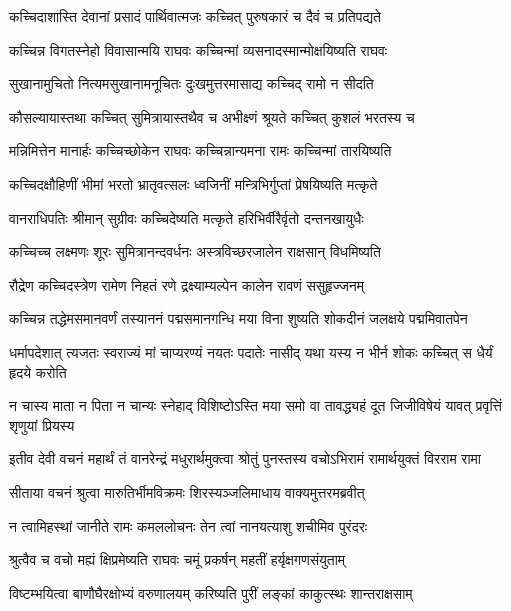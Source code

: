 \twolineshloka
{कच्चिदाशास्ति देवानां प्रसादं पार्थिवात्मजः}
{कच्चित् पुरुषकारं च दैवं च प्रतिपद्यते} %

\twolineshloka
{कच्चिन्न विगतस्नेहो विवासान्मयि राघवः}
{कच्चिन्मां व्यसनादस्मान्मोक्षयिष्यति राघवः} %

\twolineshloka
{सुखानामुचितो नित्यमसुखानामनूचितः}
{दुःखमुत्तरमासाद्य कच्चिद् रामो न सीदति} %

\twolineshloka
{कौसल्यायास्तथा कच्चित् सुमित्रायास्तथैव च}
{अभीक्ष्णं श्रूयते कच्चित् कुशलं भरतस्य च} %

\twolineshloka
{मन्निमित्तेन मानार्हः कच्चिच्छोकेन राघवः}
{कच्चिन्नान्यमना रामः कच्चिन्मां तारयिष्यति} %

\twolineshloka
{कच्चिदक्षौहिणीं भीमां भरतो भ्रातृवत्सलः}
{ध्वजिनीं मन्त्रिभिर्गुप्तां प्रेषयिष्यति मत्कृते} %

\twolineshloka
{वानराधिपतिः श्रीमान् सुग्रीवः कच्चिदेष्यति}
{मत्कृते हरिभिर्वीरैर्वृतो दन्तनखायुधैः} %

\twolineshloka
{कच्चिच्च लक्ष्मणः शूरः सुमित्रानन्दवर्धनः}
{अस्त्रविच्छरजालेन राक्षसान् विधमिष्यति} %

\twolineshloka
{रौद्रेण कच्चिदस्त्रेण रामेण निहतं रणे}
{द्रक्ष्याम्यल्पेन कालेन रावणं ससुहृज्जनम्} %

\twolineshloka
{कच्चिन्न तद्धेमसमानवर्णं तस्याननं पद्मसमानगन्धि}
{मया विना शुष्यति शोकदीनं जलक्षये पद्ममिवातपेन} %

\twolineshloka
{धर्मापदेशात् त्यजतः स्वराज्यं मां चाप्यरण्यं नयतः पदातेः}
{नासीद् यथा यस्य न भीर्न शोकः कच्चित् स धैर्यं हृदये करोति} %

\twolineshloka
{न चास्य माता न पिता न चान्यः स्नेहाद् विशिष्टोऽस्ति मया समो वा}
{तावद्ध्यहं दूत जिजीविषेयं यावत् प्रवृत्तिं शृणुयां प्रियस्य} %

\twolineshloka
{इतीव देवी वचनं महार्थं तं वानरेन्द्रं मधुरार्थमुक्त्वा}
{श्रोतुं पुनस्तस्य वचोऽभिरामं रामार्थयुक्तं विरराम रामा} %

\twolineshloka
{सीताया वचनं श्रुत्वा मारुतिर्भीमविक्रमः}
{शिरस्यञ्जलिमाधाय वाक्यमुत्तरमब्रवीत्} %

\twolineshloka
{न त्वामिहस्थां जानीते रामः कमललोचनः}
{तेन त्वां नानयत्याशु शचीमिव पुरंदरः} %

\twolineshloka
{श्रुत्वैव च वचो मह्यं क्षिप्रमेष्यति राघवः}
{चमूं प्रकर्षन् महतीं हर्यृक्षगणसंयुताम्} %

\twolineshloka
{विष्टम्भयित्वा बाणौघैरक्षोभ्यं वरुणालयम्}
{करिष्यति पुरीं लङ्कां काकुत्स्थः शान्तराक्षसाम्} %

